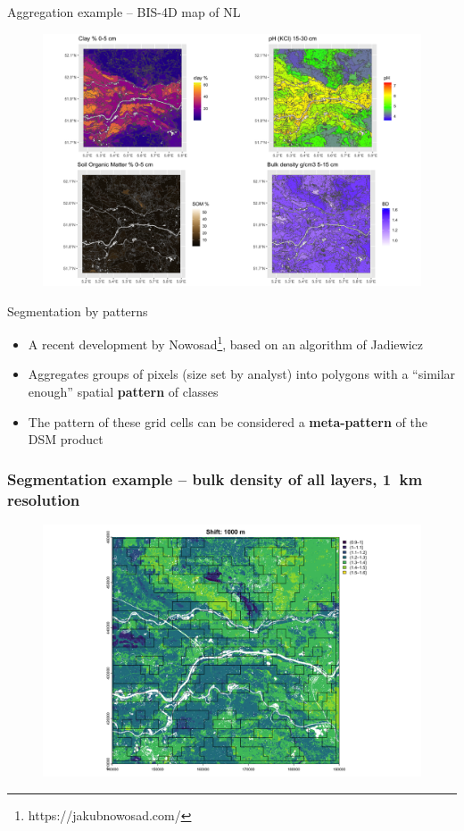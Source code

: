 \documentclass[aspectratio=169, 10pt]{beamer}
\begin{document}
\begin{frame}{Aggregation example -- BIS-4D map of NL}
    \begin{figure}
        \centering        \includegraphics[height=0.75\textheight]{graphics_david/plot-supercells-bis4d-1-jsd-all-4up-1.png}
      \end{figure}
\end{frame}


\begin{frame}{Segmentation by patterns}
\begin{itemize}
    \item 
A recent development by Nowosad\footnote{https://jakubnowosad.com/}, based on an algorithm of Jadiewicz    
\item Aggregates groups of pixels (size set by analyst) into polygons with a ``similar enough'' spatial \textbf{pattern} of classes
\item The pattern of these grid cells can be considered a \textbf{meta-pattern} of the DSM product
\end{itemize}
\end{frame}

\begin{frame}
  \frametitle{Segmentation example -- bulk density of all layers, 1~km resolution}
    \begin{figure}
        \centering        \includegraphics[height=0.75\textheight]{graphics_david/all-files-resolutions-3.png}
      \end{figure}
\end{frame}
      
\end{document}
